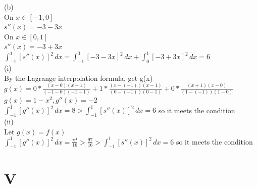 \documentclass[a4paper]{article}
\begin{document}
(b)\\
On $x \in [-1,0]$\\
$s''(x)=-3-3x$\\
On $x \in [0,1]$\\
$s''(x)=-3+3x$\\
$\int_{-1}^1 [s''(x)]^2 \, dx =\int_{-1}^0 [-3-3x]^2 \, dx+\int_{0}^1 [-3+3x]^2 \, dx =6 $\\
(i)\\
By the Lagrange interpolation formula, get g(x)\\
$g(x)=0*\frac{(x-0)(x-1)}{(-1-0)(-1-1)}+1*\frac{(x-(-1))(x-1)}{(0-(-1))(0-1)}+0*\frac{(x+1)(x-0)}{(1-(-1))(1-0)}$\\
$g(x)=1-x^2,g''(x)=-2$\\
$\int_{-1}^1 [g''(x)]^2 \, dx =8>\int_{-1}^1 [s''(x)]^2 \, dx=6$ so it meets the condition\\
(ii)\\
Let $g(x)=f(x)$\\
$\int_{-1}^1 [g''(x)]^2 \, dx=\frac{\pi^4}{16}>\frac{97}{16}>\int_{-1}^1 [s''(x)]^2 \, dx=6$ so it meets the condition\\

\section*{V}
\end{document}
